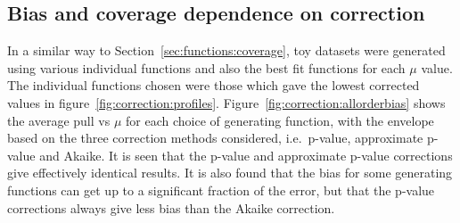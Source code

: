 


\subsection{Bias and coverage dependence on correction}
\label{sec:correction:bias}

In a similar way to Section~\ref{sec:functions:coverage}, toy datasets
were generated using various individual functions and also the best fit
functions for each $\mu$ value. The individual functions chosen were those
which gave the lowest corrected \nll values in
figure~\ref{fig:correction:profiles}.
Figure~\ref{fig:correction:allorderbias} shows the average pull vs $\mu$
for each choice of generating function, with the envelope based on the
three correction methods considered, i.e.~p-value, approximate p-value
and Akaike. It is seen that the p-value and approximate p-value corrections give
effectively identical results. It is also found that the bias for some
generating functions can get up to a significant fraction of the error, but
that the p-value corrections always give less bias than the Akaike correction.
%
